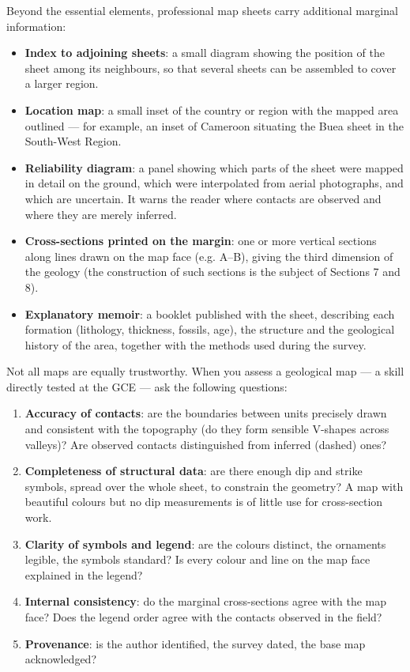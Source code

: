 \documentclass[11pt]{article}
\newcounter{popsec}
\newcounter{popsub}
\newcommand{\courssub}[1]{%
  \stepcounter{popsub}%
  \par\vspace{9pt}\noindent{\popxbold\fontsize{11.5}{13}\selectfont\color{popink}{\color{poporange}\thepopsec.\thepopsub}\hspace{6pt}#1}\par\nopagebreak\vspace{4pt}
}
\begin{document}
Beyond the essential elements, professional map sheets carry additional marginal information:

\begin{itemize}
\item \textbf{Index to adjoining sheets}: a small diagram showing the position of the sheet among its neighbours, so that several sheets can be assembled to cover a larger region.
\item \textbf{Location map}: a small inset of the country or region with the mapped area outlined — for example, an inset of Cameroon situating the Buea sheet in the South-West Region.
\item \textbf{Reliability diagram}: a panel showing which parts of the sheet were mapped in detail on the ground, which were interpolated from aerial photographs, and which are uncertain. It warns the reader where contacts are observed and where they are merely inferred.
\item \textbf{Cross-sections printed on the margin}: one or more vertical sections along lines drawn on the map face (e.g. A--B), giving the third dimension of the geology (the construction of such sections is the subject of Sections 7 and 8).
\item \textbf{Explanatory memoir}: a booklet published with the sheet, describing each formation (lithology, thickness, fossils, age), the structure and the geological history of the area, together with the methods used during the survey.
\end{itemize}

\courssub{Quality Criteria of a Good Geological Map}

Not all maps are equally trustworthy. When you assess a geological map — a skill directly tested at the GCE — ask the following questions:

\begin{enumerate}
\item \textbf{Accuracy of contacts}: are the boundaries between units precisely drawn and consistent with the topography (do they form sensible V-shapes across valleys)? Are observed contacts distinguished from inferred (dashed) ones?
\item \textbf{Completeness of structural data}: are there enough dip and strike symbols, spread over the whole sheet, to constrain the geometry? A map with beautiful colours but no dip measurements is of little use for cross-section work.
\item \textbf{Clarity of symbols and legend}: are the colours distinct, the ornaments legible, the symbols standard? Is every colour and line on the map face explained in the legend?
\item \textbf{Internal consistency}: do the marginal cross-sections agree with the map face? Does the legend order agree with the contacts observed in the field?
\item \textbf{Provenance}: is the author identified, the survey dated, the base map acknowledged?
\end{enumerate}
\end{document}
